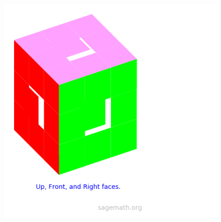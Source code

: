 \documentclass{beamer}
\begin{document}
\begin{frame}[fragile=singleslide]
\begin{figure}
        \includegraphics[scale=0.25]{images/plot3d_cube.png}
    \end{figure}
\end{frame}
\end{document}
